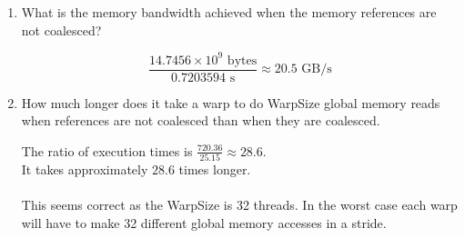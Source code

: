 \documentclass{article}
\newenvironment{answer}
{\par\color{blue}}
{\normalfont\par}
\begin{document}
\begin{enumerate}
\begin{enumerate}
              \item What is the memory bandwidth achieved when the memory references are
                    not coalesced?

                    \begin{answer}
                        $$ \frac{14.7456 \times 10^9 \textrm{ bytes}}{0.7203594 \textrm{ s}} \approx 20.5 \textrm{ GB/s} $$
                    \end{answer}

              \item How much longer does it take a warp to do WarpSize global memory
                    reads when references are not coalesced than when they are coalesced.

                    \begin{answer}
                        The ratio of execution times is $\frac{720.36}{25.15} \approx 28.6$.
                        \\
                        It takes approximately $28.6$ times longer.
                        \\ \\
                        This seems correct as the WarpSize is 32 threads. In the worst case each warp will have to make 32 different global memory accesses
                        in a stride.
                    \end{answer}

          \end{enumerate}


\end{enumerate}
\end{document}
